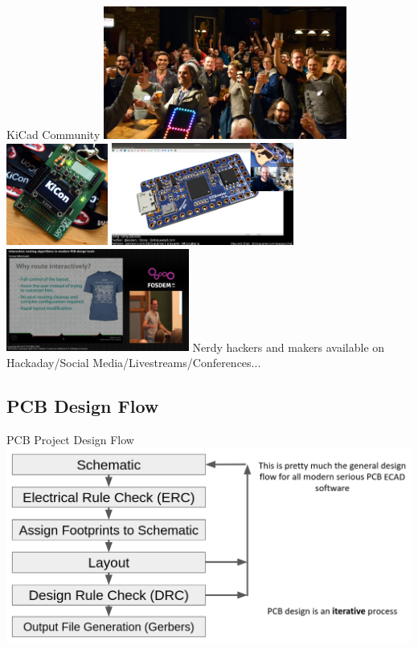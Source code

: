 \documentclass{beamer}
\begin{document}
\begin{frame}{KiCad Community}
  \centering
  \includegraphics[width=0.6\textwidth]{images/kicon-crowded.png}
  \includegraphics[width=0.25\textwidth]{images/kicon.jpg}
  \includegraphics[width=0.45\textwidth]{images/kicad-live.jpg}
  \includegraphics[width=0.45\textwidth]{images/kicad-fosdem.png}
  Nerdy hackers and makers available on Hackaday/Social Media/Livestreams/Conferences...
\end{frame}

\subsection{PCB Design Flow}

\begin{frame}{PCB Project Design Flow}
  \centering
  \includegraphics[width=\textwidth]{images/design-flow.png} 
\end{frame}
\end{document}
